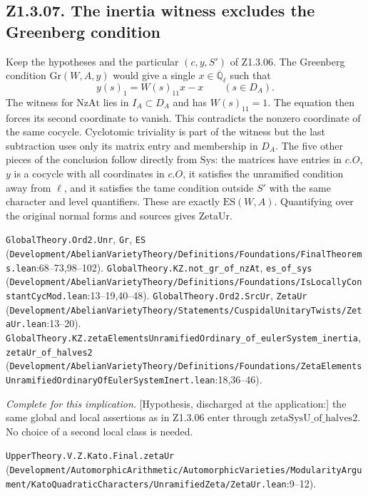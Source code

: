 \subsection{Z1.3.07. The inertia witness excludes the Greenberg condition}\label{r5:Z1.3.07}
Keep the hypotheses and the particular $(c,y,S')$ of Z1.3.06. The Greenberg condition $\mathrm{Gr}(W,A,y)$ would give a single $x\in\overline{\mathbb Q}_\ell$ such that
\[
 y(s)_1=W(s)_{11}x-x\qquad(s\in D_A).
\]
The witness for $\mathrm{NzAt}$ lies in $I_A\subset D_A$ and has $W(s)_{11}=1$. The equation then forces its second coordinate to vanish. This contradicts the nonzero coordinate of the same cocycle. Cyclotomic triviality is part of the witness but the last subtraction uses only its matrix entry and membership in $D_A$. The five other pieces of the conclusion follow directly from $\mathrm{Sys}$: the matrices have entries in $c.O$, $y$ is a cocycle with all coordinates in $c.O$, it satisfies the unramified condition away from $\ell$, and it satisfies the tame condition outside $S'$ with the same character and level quantifiers. These are exactly $\mathrm{ES}(W,A)$. Quantifying over the original normal forms and sources gives $\mathrm{ZetaUr}$.

{\footnotesize \nolinkurl{GlobalTheory.Ord2.Unr}, \nolinkurl{Gr}, \nolinkurl{ES} (\nolinkurl{Development/AbelianVarietyTheory/Definitions/Foundations/FinalTheorems.lean}\allowbreak:68--73,98--102). \nolinkurl{GlobalTheory.KZ.not_gr_of_nzAt}, \nolinkurl{es_of_sys} (\nolinkurl{Development/AbelianVarietyTheory/Definitions/Foundations/IsLocallyConstantCycMod.lean}\allowbreak:13--19,40--48). \nolinkurl{GlobalTheory.Ord2.SrcUr}, \nolinkurl{ZetaUr} (\nolinkurl{Development/AbelianVarietyTheory/Statements/CuspidalUnitaryTwists/ZetaUr.lean}\allowbreak:13--20). \nolinkurl{GlobalTheory.KZ.zetaElementsUnramifiedOrdinary_of_eulerSystem_inertia}, \nolinkurl{zetaUr_of_halves2} (\nolinkurl{Development/AbelianVarietyTheory/Definitions/Foundations/ZetaElementsUnramifiedOrdinaryOfEulerSystemInert.lean}\allowbreak:18,36--46).}

\emph{Complete for this implication.} [Hypothesis, discharged at the application:] the same global and local assertions as in Z1.3.06 enter through $\mathrm{zetaSysU\_of\_halves2}$. No choice of a second local class is needed.

{\footnotesize \nolinkurl{UpperTheory.V.Z.Kato.Final.zetaUr} (\nolinkurl{Development/AutomorphicArithmetic/AutomorphicVarieties/ModularityArgument/KatoQuadraticCharacters/UnramifiedZeta/ZetaUr.lean}\allowbreak:9--12).}

